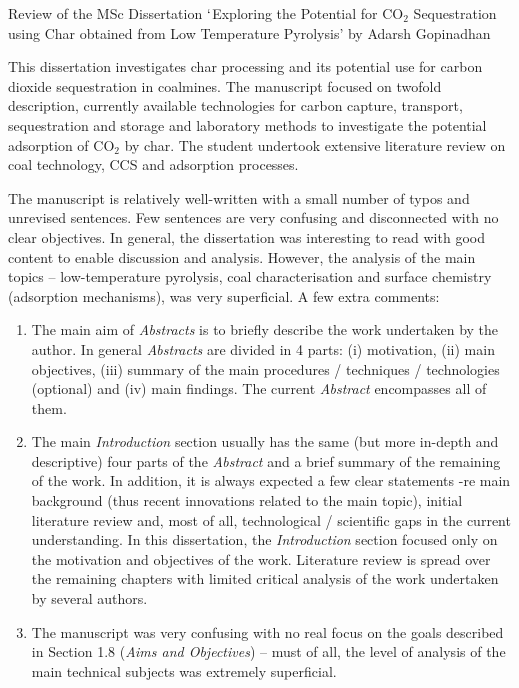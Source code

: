 \documentclass[14pt,twoside]{report}
\begin{document}
\clearpage



\bigskip

\begin{center}
{\Large Review of the MSc Dissertation $\lq$Exploring the Potential for CO$_{2}$ Sequestration using Char obtained from Low Temperature Pyrolysis' by Adarsh Gopinadhan}
\end{center}

\medskip

This dissertation investigates char processing and its potential use for carbon dioxide sequestration in coalmines. The manuscript focused on twofold description, currently available technologies for carbon capture, transport, sequestration and storage and laboratory methods to investigate the potential adsorption of CO$_{2}$ by char. The student undertook extensive literature review on coal technology, CCS and adsorption processes. 

The manuscript is relatively well-written with a small number of typos and unrevised sentences. Few sentences are very confusing and disconnected with no clear objectives. In general, the dissertation was interesting to read with good content to enable discussion and analysis. However, the analysis of the main topics -- low-temperature pyrolysis, coal characterisation and surface chemistry (adsorption mechanisms),  was very superficial. A few extra comments:
\begin{enumerate}
\item The main aim of {\it Abstracts} is to briefly describe the work undertaken by the author. In general {\it Abstracts} are divided in 4 parts: (i) motivation, (ii) main objectives, (iii) summary of the main procedures / techniques / technologies (optional) and (iv) main findings. The current {\it Abstract} encompasses all of them.
%
\item The main {\it Introduction} section usually has the same (but more in-depth and descriptive) four parts of the {\it Abstract} and a brief summary of the remaining of the work. In addition, it is always expected a few clear statements -re main background (thus recent innovations related to the main topic), initial literature review and, most of all, technological / scientific gaps in the current understanding. In this dissertation, the {\it Introduction} section focused only on the motivation and objectives of the work. Literature review is spread over the remaining chapters with limited critical analysis of the work undertaken by several authors. 
%
\item The manuscript was very confusing with no real focus on the goals described in Section 1.8 ({\it Aims and Objectives}) -- must of all, the level of analysis of the main technical subjects was extremely superficial. 
% 
\end{enumerate}
\end{document}
